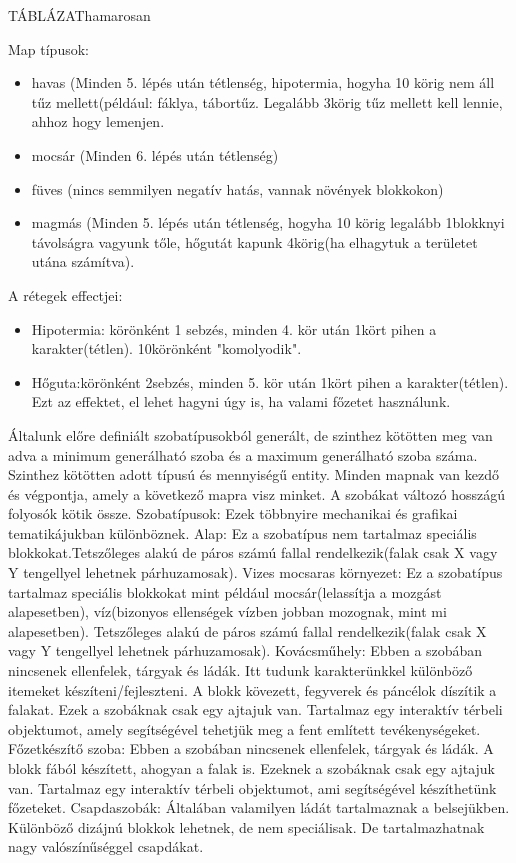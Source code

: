 
TÁBLÁZAT{hamarosan}


Map típusok:
\begin{itemize}
    \item havas (Minden 5. lépés után tétlenség, hipotermia, hogyha 10 körig nem áll tűz mellett(például: fáklya, tábortűz. Legalább 3körig tűz mellett kell lennie, ahhoz hogy lemenjen. 
    \item mocsár (Minden 6. lépés után tétlenség)
    \item füves (nincs semmilyen negatív hatás, vannak növények blokkokon)
    \item magmás (Minden 5. lépés után tétlenség, hogyha 10 körig legalább 1blokknyi távolságra vagyunk tőle, hőgutát kapunk 4körig(ha elhagytuk a területet utána számítva). 
\end{itemize}
A rétegek effectjei:
\begin{itemize}
  \item Hipotermia: körönként 1 sebzés, minden 4. kör után 1kört pihen a karakter(tétlen). 10körönként "komolyodik".
  \item Hőguta:körönként 2sebzés, minden 5. kör után 1kört pihen a karakter(tétlen). Ezt az effektet, el lehet hagyni úgy is, ha valami főzetet használunk.
\end{itemize}

Általunk előre definiált szobatípusokból generált, de szinthez kötötten meg van adva a minimum generálható szoba és a maximum generálható szoba száma.
Szinthez kötötten adott típusú és mennyiségű entity.
Minden mapnak van kezdő és végpontja, amely a következő mapra visz minket.
A szobákat változó hosszágú folyosók kötik össze.
Szobatípusok:
Ezek többnyire mechanikai és grafikai tematikájukban különböznek.
Alap:
Ez a szobatípus nem tartalmaz speciális blokkokat.Tetszőleges alakú de páros számú fallal rendelkezik(falak csak X vagy Y tengellyel lehetnek párhuzamosak).
Vizes mocsaras környezet:
Ez a szobatípus tartalmaz speciális blokkokat mint például mocsár(lelassítja a mozgást alapesetben), víz(bizonyos ellenségek vízben jobban mozognak, mint mi alapesetben).
Tetszőleges alakú de páros számú fallal rendelkezik(falak csak X vagy Y tengellyel lehetnek párhuzamosak).
Kovácsműhely:
Ebben a szobában nincsenek ellenfelek, tárgyak és ládák. Itt tudunk karakterünkkel különböző itemeket készíteni/fejleszteni. A blokk kövezett, fegyverek és páncélok díszítik a falakat. Ezek a szobáknak csak egy ajtajuk van. Tartalmaz egy interaktív térbeli objektumot, amely segítségével tehetjük meg a fent említett tevékenységeket.
Főzetkészítő szoba:
Ebben a szobában nincsenek ellenfelek, tárgyak és ládák. A blokk fából készített, ahogyan a falak is. Ezeknek a szobáknak csak egy ajtajuk van. Tartalmaz egy interaktív térbeli objektumot, ami segítségével készíthetünk főzeteket.
Csapdaszobák:
Általában valamilyen ládát tartalmaznak a belsejükben.
Különböző dizájnú blokkok lehetnek, de nem speciálisak. De tartalmazhatnak nagy valószínűséggel csapdákat.

